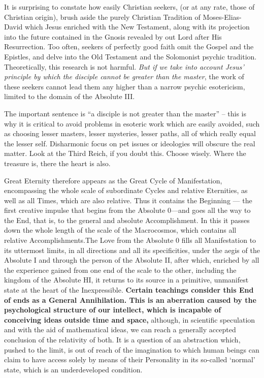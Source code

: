 \begin{quotex}
It is surprising to constate how easily Christian seekers, (or at any rate, those of Christian origin), brush aside the purely Christian Tradition of Moses-Elias-David which Jesus enriched with the New Testament, along with its projection into the future contained in the Gnosis revealed by out Lord after His Resurrection. Too often, seekers of perfectly good faith omit the Gospel and the Epistles, and delve into the Old Testament and the Solomonist psychic tradition. Theoretically, this research is not harmful. \emph{But if we take into account Jesus' principle by which the disciple cannot be greater than the master}, the work of these seekers cannot lead them any higher than a narrow psychic esotericism, limited to the domain of the Absolute III.
\end{quotex}


The important sentence is ``a disciple is not greater than the master'' -- this is why it is critical to avoid problems in esoteric work which are easily avoided, such as choosing lesser masters, lesser mysteries, lesser paths, all of which really equal the lesser self. Disharmonic focus on pet issues or ideologies will obscure the real matter. Look at the Third Reich, if you doubt this. Choose wisely. Where the treasure is, there the heart is also.

\begin{quotex}
Great Eternity therefore appears as the Great Cycle of Manifestation, encompassing the whole scale of subordinate Cycles and relative Eternities, as well as all Times, which are also relative. Thus it contains the Beginning --- the first creative impulse that begins from the Absolute 0---and goes all the way to the End, that is, to the general and absolute Accomplishment. In this it passes down the whole length of the scale of the Macrocosmos, which contains all relative Accomplishments.The Love from the Absolute 0 fills all Manifestation to its uttermost limits, in all directions and all its specificities, under the aegis of the Absolute I and through the person of the Absolute II, after which, enriched by all the experience gained from one end of the scale to the other, including the kingdom of the Absolute HI, it returns to its source in a primitive, unmanifest state at the heart of the Inexpressible. \textbf{Certain teachings consider this End of ends as a General Annihilation. This is an aberration caused by the psychological structure of our intellect, which is incapable of conceiving ideas outside time and space,} although, in scientific speculation and with the aid of mathematical ideas, we can reach a generally accepted conclusion of the relativity of both. It is a question of an abstraction which, pushed to the limit, is out of reach of the imagination to which human beings can claim to have access solely by means of their Personality in its so-called `normal' state, which is an underdeveloped condition.
\end{quotex}


